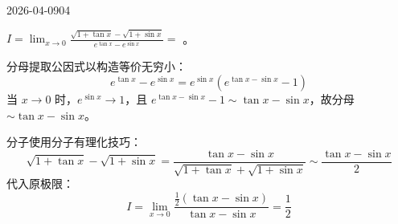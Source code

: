\begin{mistake}{2026-04-09}{04}

\begin{problemcontent}
\( I = \lim_{x \to 0} \frac{\sqrt{1+\tan x} - \sqrt{1+\sin x}}{e^{\tan x} - e^{\sin x}} = \) \underline{\hspace{2em}}。
\end{problemcontent}

\begin{solutioncontent}
分母提取公因式以构造等价无穷小：
\[
e^{\tan x} - e^{\sin x} = e^{\sin x}(e^{\tan x - \sin x} - 1)
\]
当 \(x \to 0\) 时，\(e^{\sin x} \to 1\)，且 \(e^{\tan x - \sin x} - 1 \sim \tan x - \sin x\)，故分母 \(\sim \tan x - \sin x\)。

分子使用分子有理化技巧：
\[
\sqrt{1+\tan x} - \sqrt{1+\sin x} = \frac{\tan x - \sin x}{\sqrt{1+\tan x} + \sqrt{1+\sin x}} \sim \frac{\tan x - \sin x}{2}
\]
代入原极限：
\[
I = \lim_{x \to 0} \frac{\frac{1}{2}(\tan x - \sin x)}{\tan x - \sin x} = \frac{1}{2}
\]
\end{solutioncontent}


\end{mistake}
